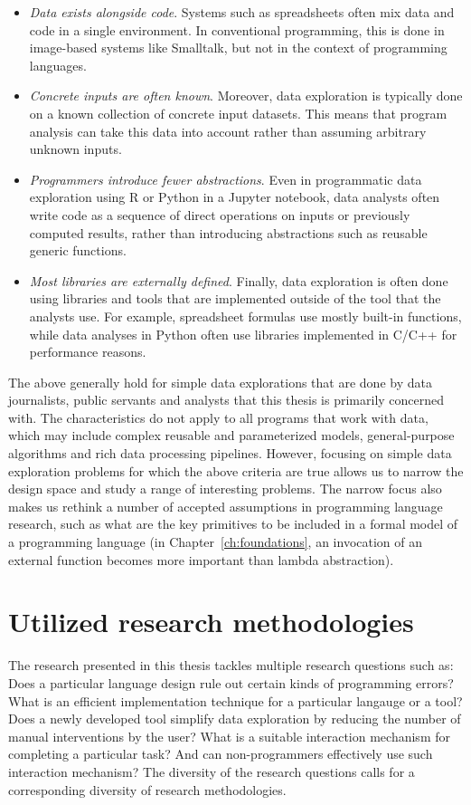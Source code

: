 \documentclass[fleqn,11pt]{report}
\theoremstyle{definition}
\newenvironment{nitemize}
{ \vspace{-0.4em}
  \begin{itemize}
    \setlength{\itemsep}{5pt}
    \setlength{\parskip}{0pt}
    \setlength{\parsep}{0pt} }
{ \end{itemize}
  \vspace{-0.4em} }
\begin{document}
\begin{nitemize}
\item \emph{Data exists alongside code}. Systems such as spreadsheets often mix
  data and code in a single environment. In conventional programming, this is done in
  image-based systems like Smalltalk, but not in the context of programming languages.

\item \emph{Concrete inputs are often known}. Moreover, data exploration is typically done on a
  known collection of concrete input datasets. This means that program analysis can take
  this data into account rather than assuming arbitrary unknown inputs.

\item \emph{Programmers introduce fewer abstractions}. Even in programmatic data exploration using
  R or Python in a Jupyter notebook, data analysts often write code as a sequence of
  direct operations on inputs or previously computed results, rather than introducing abstractions
  such as reusable generic functions.

\item \emph{Most libraries are externally defined}. Finally, data exploration is
  often done using libraries and tools that are implemented outside of the tool that the analysts
  use. For example, spreadsheet formulas use mostly built-in functions, while data analyses in
  Python often use libraries implemented in C/C++ for performance reasons.
\end{nitemize}

The above generally hold for simple data explorations that are done by data journalists, public
servants and analysts that this thesis is primarily concerned with. The characteristics do not
apply to all programs that work with data, which may include complex reusable and parameterized
models, general-purpose algorithms and rich data processing pipelines. However, focusing on simple
data exploration problems for which the above criteria are true allows us to narrow the design
space and study a range of interesting problems. The narrow focus also makes us rethink a number of
accepted assumptions in programming language research, such as what are the key primitives to be
included in a formal model of a programming language (in Chapter~\ref{ch:foundations}, an
invocation of an external function becomes more important than lambda abstraction).

\section{Utilized research methodologies}
The research presented in this thesis tackles multiple research questions such as:
Does a particular language design rule out certain kinds of programming errors? What is an
efficient implementation technique for a particular langauge or a tool? Does a newly
developed tool simplify data exploration by reducing the number of manual interventions
by the user? What is a suitable interaction mechanism for completing a particular task?
And can non-programmers effectively use such interaction mechanism?
The diversity of the research questions calls for a corresponding diversity of research
methodologies.
\end{document}
